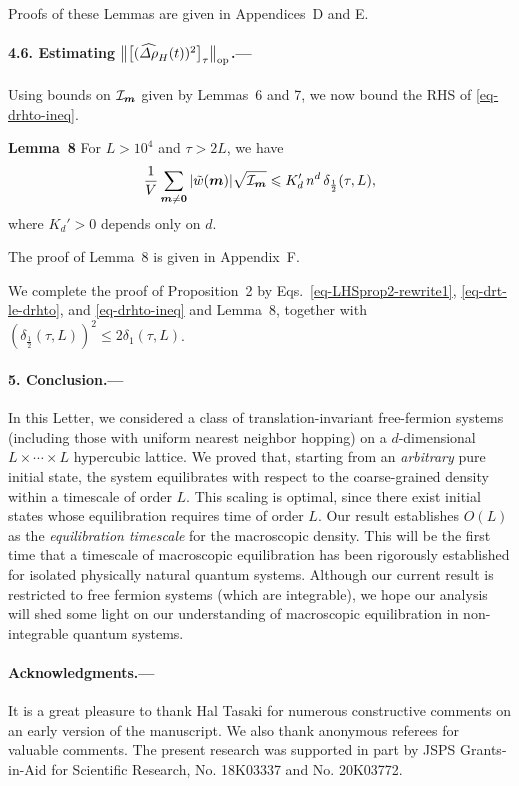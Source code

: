 \documentclass[aps,prl,superscriptaddress,reprint]{revtex4-2}
\newcommand{\se}[1]{\paragraph{#1.---}}
\newcommand{\bfthm}[1]{\noindent\textbf{#1}}
\theoremstyle{definition}
\newcommand{\abs}[1]{{\left\vert #1 \right\vert}}
\newcommand{\nparen}[1]{{( #1 )}}
\newcommand{\bigbrak}[1]{\bigl[{#1}\bigr]}
\newcommand{\II}{{\cal I}}
\newcommand{\ti}{\tilde}
\newcommand{\wh}{\widehat}
\newcommand{\ta}{\tau}
\renewcommand{\d}{\delta}
\newcommand{\De}{\varDelta}
\renewcommand{\r}{\rho}
\newcommand{\f}{\frac}
\newcommand{\ve}[1]{\boldsymbol{#1}}
\renewcommand{\le}{\leqslant}
\newcommand{\mm}{{\ve m}}
\newcommand{\zz}{{\ve 0}}
\newcommand{\timescale}{timescale}
\begin{document}
\smallskip

Proofs of these Lemmas are given in Appendices~D and E.


\se{4.6. Estimating
  $\bigl \| \bigbrak{ (\wh{\De\r}_H(t))^2 }_\ta \bigr \|_{\rm op}$}

Using bounds on $\II_\mm$ given by Lemmas~6 and 7,
we now bound the RHS of \eqref{eq-drhto-ineq}.

\smallskip

\bfthm{Lemma~8}
For $L>10^4$ and $\ta>2L$,
we have
\begin{align}
  	\f1V\sum_{\mm\ne\zz}\abs{\ti w(\mm)}\sqrt{\II_\mm}
  	\le
    K_{d}' \, n^d \,
  	\d_{\f12}(\ta,L),
\end{align}
where $K_d'>0$ depends only on $d$.

\smallskip

The proof of Lemma~8 is given in Appendix~F.


\smallskip

We complete the proof of Proposition~2 by
Eqs.~\eqref{eq-LHSprop2-rewrite1},
\eqref{eq-drt-le-drhto}, and
\eqref{eq-drhto-ineq} and  Lemma~8,
together with
$\nparen{\d_{\f12}(\ta,L)}^2\le 2\d_{1}(\ta,L)$.



\medskip

\se{5. Conclusion}

In this Letter, we considered
a  class of translation-invariant free-fermion systems
(including those with uniform nearest neighbor hopping)
on a $d$-dimensional $L \times \cdots \times L$ hypercubic lattice.
We proved that, starting from an \emph{arbitrary} pure initial state,
the system equilibrates with respect to
the coarse-grained density within a {\timescale} of order $L$.
This scaling is optimal,
since there exist initial states whose equilibration requires time of order $L$.
Our result establishes $O(L)$ as the \emph{equilibration {\timescale}} for the macroscopic density.
This will be the first time  that
a {\timescale} of macroscopic equilibration has been rigorously established for
isolated physically natural quantum systems.
Although our current result is restricted to free fermion systems (which are integrable),
we hope our analysis will shed some light on
our understanding of macroscopic equilibration in non-integrable quantum systems.



\medskip

\se{Acknowledgments}
It is a great pleasure to thank Hal Tasaki for numerous constructive
comments on an early version of the manuscript.
We also thank anonymous referees for valuable comments.
The present research was supported in part by JSPS Grants-in-Aid for
Scientific Research, No. 18K03337 and No. 20K03772.
\end{document}
